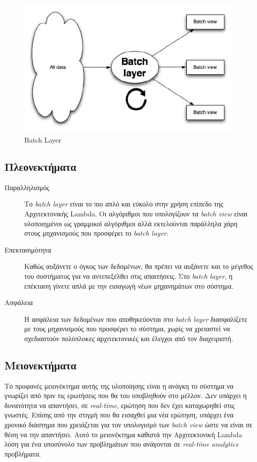 \begin{figure}[t]
\caption{Batch Layer}
\includegraphics[width=12cm]{images/batch_layer.jpg}
\centering
\end{figure}
\clearpage

\subsection{Πλεονεκτήματα}
\begin{description}
\item[Παραλληλισμός] Το \textit{batch layer} είναι το πιο απλό και εύκολο στην χρήση επίπεδο της Αρχιτεκτονικής Lambda. Οι αλγόριθμοι που υπολογίζουν τα \textit{batch view} είναι υλοποιημένοι ως γραμμικοί αλγόριθμοι αλλά εκτελούνται παράλληλα χάρη στους μηχανισμούς που προσφέρει το \textit{batch layer}.
\item[Επεκτασιμότητα] Καθώς αυξάνετε ο όγκος των δεδομένων, θα πρέπει να αυξάνετε και το μέγεθος του συστήματος για να αντεπεξέλθει στις απαιτήσεις. Στο \textit{batch layer}, η επέκταση γίνετε απλά με την εισαγωγή νέων μηχανημάτων στο σύστημα.
\item[Ασφάλεια] Η ασφάλεια των δεδομένων που αποθηκεύονται στο \textit{batch layer} διασφαλίζετε με τους μηχανισμούς που προσφέρει το σύστημα, χωρίς να χρειαστεί να σχεδιαστούν πολύπλοκες αρχιτεκτονικές και έλεγχοι από τον διαχειριστή.
\end{description}


\subsection{Μειονεκτήματα}
Το προφανές μειονέκτημα αυτής της υλοποίησης είναι η ανάγκη το σύστημα να γνωρίζει από πριν τις ερωτήσεις που θα του υποβληθούν στο μέλλον. Δεν υπάρχει η δυνατότητα να απαντήσει, σε \textit{real-time}, ερώτηση που δεν έχει καταχωρηθεί στις γνωστές. Επίσης από την στιγμή που θα εισαχθεί μια νέα ερώτηση, υπάρχει ένα χρονικό διάστημα που χρειάζεται για τον υπολογισμό των \textit{batch view} ώστε να είναι σε θέση να την απαντήσει. Αυτό το μειονέκτημα καθιστά την Αρχιτεκτονική Lambda λύση για ένα υποσύνολο των προβλημάτων που ανάγονται σε \textit{real-time analytics} προβλήματα.

